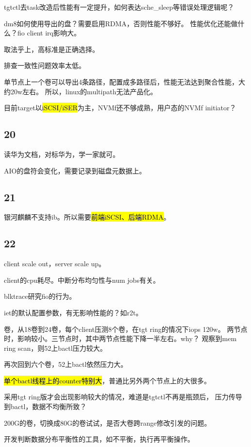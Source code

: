tgtctl去task改造后性能有一定提升，如何表达sche\_sleep等错误处理逻辑呢？

dm8如何使用导出的盘？需要启用RDMA，否则性能不够好。
性能优化还能做什么？fio client irq影响大。

取法乎上，高标准是正确选择。

排查一致性问题效率太低。

单节点上一个卷可以导出4条路径，配置成多路径后，性能无法达到聚合性能，大约20w左右。
所以，linux的multipath无法产品化。

目前target以\hl{iSCSI/iSER}为主，NVMf还不够成熟，用户态的NVMf initiator？

\subsection{20}

读华为文档，对标华为，学一家就可。

AIO的盘符会变化，需要记录到磁盘元数据上。

\subsection{21}

银河麒麟不支持ib。所以需要\hl{前端iSCSI、后端RDMA}。

\subsection{22}

client scale out，server scale up。

client的cpu耗尽。中断分布均匀性与num jobs有关。

blktrace研究fio的行为。

iet的默认配置参数，有无影响性能的？如r2t。

卷，从18卷到24卷，每个client压测8个卷，在tgt ring的情况下iops 120w。
两节点时，影响较小。三节点时，其中两节点性能下降一半左右。why？
观察到mem ring scan，则52上bactl压力较大。

再次回到六个卷，52上bactl依然压力大。

\hl{单个bactl线程上的counter特别大}，普通比另外两个节点上的大很多。

采用tgt ring版才会出现影响较大的情况，难道是tgtctl不再是瓶颈后，
压力传导到bactl，数据不均衡所致？

200G的卷，切换成80G的卷试试，是否大卷跨range修改引发的问题。

开发判断数据分布平衡性的工具，如不平衡，执行再平衡操作。

